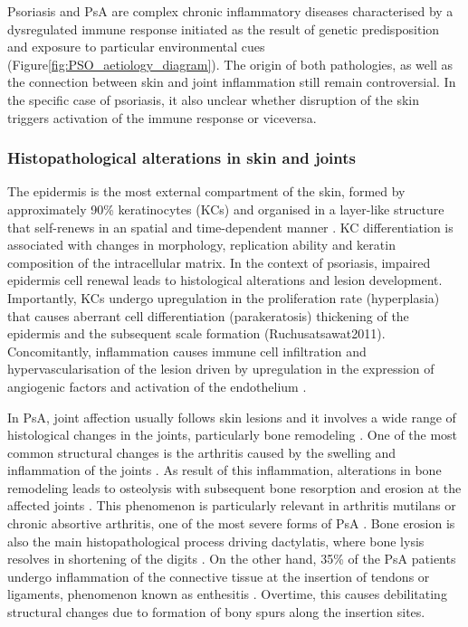 Psoriasis and PsA are complex chronic inflammatory diseases characterised by a dysregulated immune response initiated as the result of genetic predisposition and exposure to particular environmental cues (Figure\ref{fig:PSO_aetiology_diagram}). The origin of both pathologies, as well as the connection between skin and joint inflammation still remain controversial. In the specific case of psoriasis, it also unclear whether disruption of the skin triggers activation of the immune response or viceversa.



\subsubsection*{Histopathological alterations in skin and joints}

The epidermis is the most external compartment of the skin, formed by approximately 90\% keratinocytes (KCs) and organised in a layer-like structure that self-renews in an spatial and time-dependent manner \parencite{Wikramanayake2014}. KC differentiation is associated with changes in morphology, replication ability and keratin composition of the intracellular matrix. In the context of psoriasis, impaired epidermis cell renewal leads to histological alterations and lesion development. Importantly, KCs undergo upregulation in the proliferation rate (hyperplasia) that causes aberrant cell differentiation (parakeratosis) thickening of the epidermis and the subsequent scale formation (Ruchusatsawat2011). Concomitantly, inflammation causes immune cell infiltration and hypervascularisation of the lesion driven by upregulation in the expression of angiogenic factors and activation of the endothelium \parencite{Perera2012}.  

In PsA, joint affection usually follows skin lesions and it involves a wide range of histological changes in the joints, particularly bone remodeling \parencite{Haddad2013}. One of the most common structural changes is the arthritis caused by the swelling and inflammation of the joints \parencite{Schett2011}. As result of this inflammation, alterations in bone remodeling leads to osteolysis with subsequent bone resorption and erosion at the affected joints \parencite{Mensah2017}. This phenomenon is particularly relevant in arthritis mutilans or chronic absortive arthritis, one of the most severe forms of PsA \parencite{Haddad2013}. Bone erosion is also the main histopathological process driving dactylatis, where bone lysis resolves in shortening of the digits \parencite{Gladman2005}. On the other hand, 35\% of the PsA patients undergo inflammation of the connective tissue at the insertion of tendons or ligaments, phenomenon known as enthesitis \parencite{McGonagle2011,Polachek2017}. Overtime, this causes debilitating structural changes due to formation of bony spurs along the insertion sites\parencite{Schett2011}.



